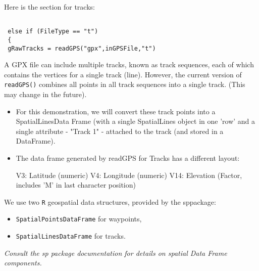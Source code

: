 \documentclass{beamer}
\begin{document}
\begin{frame}[fragile]
Here is the section for tracks:

\begin{verbatim}
 
 else if (FileType == "t")
 { 
 gRawTracks = readGPS("gpx",inGPSFile,"t")

\end{verbatim}
A GPX file can include multiple tracks, known as track sequences, each of which contains the vertices for a single track (line).
However, the current version of \texttt{readGPS()} combines all points in all  track sequences into a single track. (This may change in the future).

\end{frame}


\begin{frame}
\begin{itemize}
\item For this demonstration, we will convert these track points into a 
 SpatialLinesData Frame (with a single SpatialLines object in one 'row'
 and a single attribute - "Track 1" - attached to the track (and stored
in a DataFrame).
\item The data frame generated by readGPS for Tracks has a different layout:

 V3: Latitude (numeric) 
 V4: Longitude (numeric)
 V14: Elevation (Factor, includes 'M' in last character position)
\end{itemize} 
\end{frame}

\begin{frame}
We use two \texttt{R} geospatial data structures, provided by the sppackage:
\begin{itemize}
\item \texttt{SpatialPointsDataFrame} for waypoints, \item \texttt{SpatialLinesDataFrame} for tracks.
\end{itemize}
 \textit{Consult the sp package documentation for details on spatial Data Frame components.
}
\end{frame}
\end{document}

